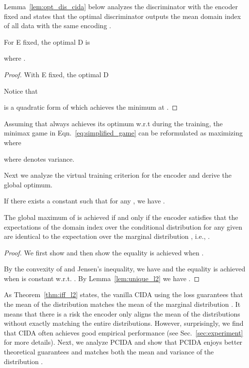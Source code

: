 \documentclass{article}
\newcommand{\secref}[1]{Sec.~\ref{#1}}
\newcommand{\lemref}[1]{Lemma~\ref{#1}}
\newcommand{\thmref}[1]{Theorem~\ref{#1}}
\newcommand{\eqnref}[1]{Eqn.~\ref{#1}}
\begin{document}
\lemref{lem:opt_dis_cida} below analyzes the discriminator  with the encoder  fixed and states that the optimal discriminator  outputs the mean domain index of all data with the same encoding . 
\begin{lemma}\label{lem:opt_dis_cida}
For E fixed, the optimal D is

where .
\end{lemma}
\begin{proof}
With E fixed, the optimal D

Notice that

is a quadratic form of  which achieves the minimum at .
\end{proof}


Assuming that  always achieves its optimum w.r.t  during the training, the minimax game in \eqnref{eq:simplified_game} can be reformulated as maximizing  where

where  denotes variance.

Next we analyze the virtual training criterion  for the encoder and derive the global optimum. 

\begin{lemma}\label{lem:unique_l2}
If there exists a constant  such that  for any , we have .
\end{lemma}

\begin{theorem}\label{thm:iff_l2}
The global maximum of  is achieved if and only if the encoder  satisfies that the expectations of the domain index  over the conditional distribution  for any given  are identical to the expectation over the marginal distribution , i.e., .
\end{theorem}
\begin{proof}
We first show  and then show the equality is achieved when .
\begingroup\makeatletter\def\f@size{9}\check@mathfonts

\endgroup
By the convexity of  and Jensen's inequality, we have  and the equality is achieved when  is constant w.r.t. . By \lemref{lem:unique_l2} we have .
\end{proof}



As \thmref{thm:iff_l2} states, the vanilla CIDA using the  loss guarantees that the mean of the distribution  matches the mean of the marginal distribution .
It means that there is a risk the encoder  only aligns the mean of the distributions without exactly matching the entire distributions. However, surprisingly, we find that CIDA often achieves good empirical performance (see \secref{sec:experiment} for more details). Next, we analyze PCIDA and show that PCIDA enjoys better theoretical guarantees and matches both the mean and variance of the distribution .
\end{document}
